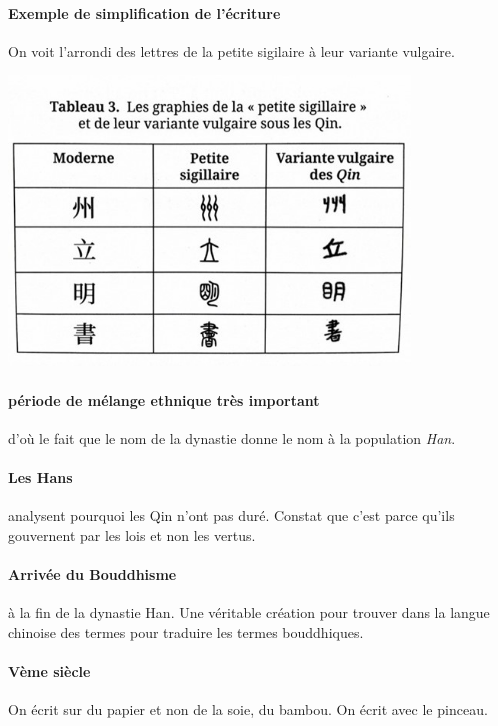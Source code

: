 \paragraph{Exemple de simplification de l'écriture} On voit l'arrondi des lettres de la petite sigilaire à leur variante vulgaire. 


\includegraphics[width=0.8\textwidth]{ConfucianismeTaoismeBouddhismeChinois/Images/QinEcritureExemple.jpg}

\paragraph{période de mélange ethnique très important} d'où le fait que le nom de la dynastie donne le nom à la population \textit{Han}. 

\paragraph{Les Hans} analysent pourquoi les Qin n'ont pas duré. Constat que c'est parce qu'ils gouvernent par les lois et non les vertus.

\paragraph{Arrivée du Bouddhisme} à la fin de la dynastie Han. 
Une véritable création pour trouver dans la langue chinoise des termes pour traduire les termes bouddhiques. 

\paragraph{Vème siècle} On écrit sur du papier et non de la soie, du bambou. On écrit avec le pinceau. 


